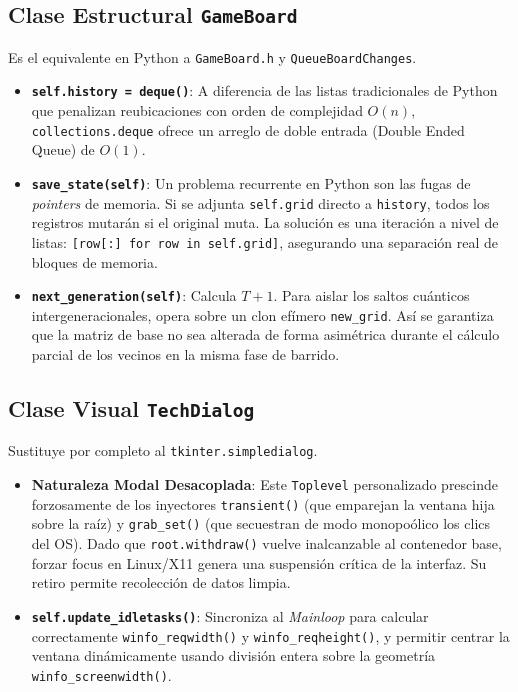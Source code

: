 \documentclass[12pt,a4paper]{article}
\begin{document}
\subsection{Clase Estructural \texttt{GameBoard}}
Es el equivalente en Python a \texttt{GameBoard.h} y \texttt{QueueBoardChanges}.
\begin{itemize}
    \item \textbf{\texttt{self.history = deque()}}: A diferencia de las listas tradicionales de Python que penalizan reubicaciones con orden de complejidad $O(n)$, \texttt{collections.deque} ofrece un arreglo de doble entrada (Double Ended Queue) de $O(1)$. 
    \item \textbf{\texttt{save\_state(self)}}: Un problema recurrente en Python son las fugas de \textit{pointers} de memoria. Si se adjunta \texttt{self.grid} directo a \texttt{history}, todos los registros mutarán si el original muta. La solución es una iteración a nivel de listas: \texttt{[row[:] for row in self.grid]}, asegurando una separación real de bloques de memoria.
    \item \textbf{\texttt{next\_generation(self)}}: Calcula $T+1$. Para aislar los saltos cuánticos intergeneracionales, opera sobre un clon efímero \texttt{new\_grid}. Así se garantiza que la matriz de base no sea alterada de forma asimétrica durante el cálculo parcial de los vecinos en la misma fase de barrido.
\end{itemize}

\subsection{Clase Visual \texttt{TechDialog}}
Sustituye por completo al \texttt{tkinter.simpledialog}.
\begin{itemize}
    \item \textbf{Naturaleza Modal Desacoplada}: Este \texttt{Toplevel} personalizado prescinde forzosamente de los inyectores \texttt{transient()} (que emparejan la ventana hija sobre la raíz) y \texttt{grab\_set()} (que secuestran de modo monopoólico los clics del OS). Dado que \texttt{root.withdraw()} vuelve inalcanzable al contenedor base, forzar focus en Linux/X11 genera una suspensión crítica de la interfaz. Su retiro permite recolección de datos limpia.
    \item \textbf{\texttt{self.update\_idletasks()}}: Sincroniza al \textit{Mainloop} para calcular correctamente \texttt{winfo\_reqwidth()} y \texttt{winfo\_reqheight()}, y permitir centrar la ventana dinámicamente usando división entera sobre la geometría \texttt{winfo\_screenwidth()}.
\end{itemize}
\end{document}
